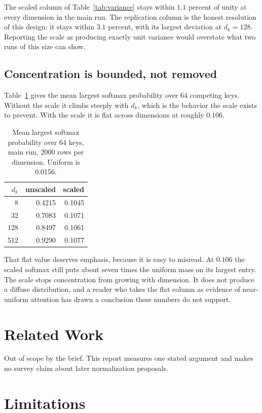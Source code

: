 \documentclass[11pt]{article}
\begin{document}
The scaled column of Table~\ref{tab:variance} stays within $1.1$ percent of
unity at every dimension in the main run. The replication column is the honest
resolution of this design: it stays within $3.1$ percent, with its largest
deviation at $d_k = 128$. Reporting the scale as producing exactly unit
variance would overstate what two runs of this size can show.

\subsection{Concentration is bounded, not removed}

Table~\ref{tab:softmax} gives the mean largest softmax probability over 64
competing keys. Without the scale it climbs steeply with $d_k$, which is the
behavior the scale exists to prevent. With the scale it is flat across
dimensions at roughly $0.106$.

\begin{table}[t]
\centering
\caption{Mean largest softmax probability over 64 keys, main run, 2000 rows per dimension. Uniform is 0.0156.}
\label{tab:softmax}
\begin{tabular}{rrr}
\toprule
$d_k$ & unscaled & scaled \\
\midrule
8 & 0.4215 & 0.1045 \\
32 & 0.7083 & 0.1071 \\
128 & 0.8497 & 0.1061 \\
512 & 0.9290 & 0.1077 \\
\bottomrule
\end{tabular}
\end{table}

That flat value deserves emphasis, because it is easy to misread. At $0.106$
the scaled softmax still puts about seven times the uniform mass on its
largest entry. The scale stops concentration from growing with dimension. It
does not produce a diffuse distribution, and a reader who takes the flat
column as evidence of near-uniform attention has drawn a conclusion these
numbers do not support.

\section{Related Work}

Out of scope by the brief. This report measures one stated argument and makes
no survey claim about later normalization proposals.

\section{Limitations}
\end{document}
